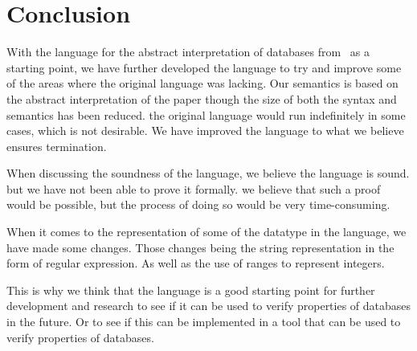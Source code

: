\section{Conclusion} \label{sec:conclusion}
With the language for the abstract interpretation of databases from~\cite{halder_abstract_2012} as a starting point, we have further developed the language to try and improve some of the areas where the original language was lacking.
Our semantics is based on the abstract interpretation of the paper though the size of both the syntax and semantics has been reduced.
the original language would run indefinitely in some cases, which is not desirable.
We have improved the language to what we believe ensures termination.

When discussing the soundness of the language, we believe the language is sound.
but we have not been able to prove it formally.
we believe that such a proof would be possible, but the process of doing so would be very time-consuming.

When it comes to the representation of some of the datatype in the language, we have made some changes.
Those changes being the string representation in the form of regular expression.
As well as the use of ranges to represent integers.

This is why we think that the language is a good starting point for further development and research to see if it can be used to verify properties of databases in the future.
Or to see if this can be implemented in a tool that can be used to verify properties of databases.


